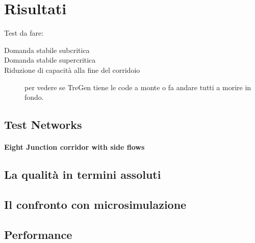 
\chapter{Risultati}
Test da fare:
\begin{description}
\item[Domanda stabile subcritica]
\item[Domanda stabile supercritica]
\item[Riduzione di capacità alla fine del corridoio] per vedere se TreGen tiene le code a monte o fa andare tutti a morire in fondo.
\end{description}

\section{Test Networks}

\subsubsection{Eight Junction corridor with side flows} \label{s:sync8}


\section{La qualità in termini assoluti}




\section{Il confronto con microsimulazione}


\section{Performance}